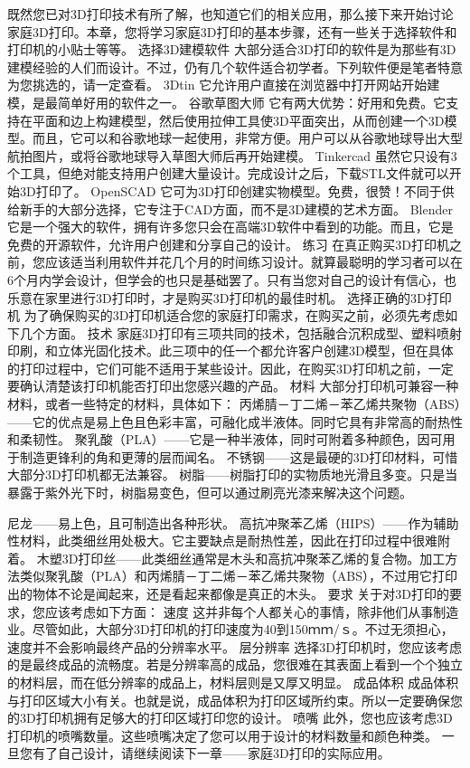 \documentclass[12pt,UTF8]{ctexbook}
\begin{document}
既然您已对3D打印技术有所了解，也知道它们的相关应用，那么接下来开始讨论家庭3D打印。本章，您将学习家庭3D打印的基本步骤，还有一些关于选择软件和打印机的小贴士等等。
选择3D建模软件
大部分适合3D打印的软件是为那些有3D建模经验的人们而设计。不过，仍有几个软件适合初学者。下列软件便是笔者特意为您挑选的，请一定查看。
3Dtin
它允许用户直接在浏览器中打开网站开始建模，是最简单好用的软件之一。
谷歌草图大师
它有两大优势：好用和免费。它支持在平面和边上构建模型，然后使用拉伸工具使3D平面突出，从而创建一个3D模型。而且，它可以和谷歌地球一起使用，非常方便。用户可以从谷歌地球导出大型航拍图片，或将谷歌地球导入草图大师后再开始建模。
Tinkercad
虽然它只设有3个工具，但绝对能支持用户创建大量设计。完成设计之后，下载STL文件就可以开始3D打印了。
OpenSCAD
它可为3D打印创建实物模型。免费，很赞！不同于供给新手的大部分选择，它专注于CAD方面，而不是3D建模的艺术方面。
Blender
它是一个强大的软件，拥有许多您只会在高端3D软件中看到的功能。而且，它是免费的开源软件，允许用户创建和分享自己的设计。
练习
在真正购买3D打印机之前，您应该适当利用软件并花几个月的时间练习设计。就算最聪明的学习者可以在6个月内学会设计，但学会的也只是基础罢了。只有当您对自己的设计有信心，也乐意在家里进行3D打印时，才是购买3D打印机的最佳时机。
选择正确的3D打印机
为了确保购买的3D打印机适合您的家庭打印需求，在购买之前，必须先考虑如下几个方面。
技术
家庭3D打印有三项共同的技术，包括融合沉积成型、塑料喷射印刷，和立体光固化技术。此三项中的任一个都允许客户创建3D模型，但在具体的打印过程中，它们可能不适用于某些设计。因此，在购买3D打印机之前，一定要确认清楚该打印机能否打印出您感兴趣的产品。
材料
大部分打印机可兼容一种材料，或者一些特定的材料，具体如下：
丙烯腈－丁二烯－苯乙烯共聚物（ABS）——它的优点是易上色且色彩丰富，可融化成半液体。同时它具有非常高的耐热性和柔韧性。
聚乳酸（PLA）——它是一种半液体，同时可附着多种颜色，因可用于制造更锋利的角和更薄的层而闻名。
不锈钢——这是最硬的3D打印材料，可惜大部分3D打印机都无法兼容。
树脂——树脂打印的实物质地光滑且多变。只是当暴露于紫外光下时，树脂易变色，但可以通过刷亮光漆来解决这个问题。

尼龙——易上色，且可制造出各种形状。
高抗冲聚苯乙烯（HIPS）——作为辅助性材料，此类细丝用处极大。它主要缺点是耐热性差，因此在打印过程中很难附着。
木塑3D打印丝——此类细丝通常是木头和高抗冲聚苯乙烯的复合物。加工方法类似聚乳酸（PLA）和丙烯腈－丁二烯－苯乙烯共聚物（ABS），不过用它打印出的物体不论是闻起来，还是看起来都像是真正的木头。
要求
关于对3D打印的要求，您应该考虑如下方面：
速度
这并非每个人都关心的事情，除非他们从事制造业。尽管如此，大部分3D打印机的打印速度为40到150ｍｍ/ｓ。不过无须担心，速度并不会影响最终产品的分辨率水平。
层分辨率
选择3D打印机时，您应该考虑的是最终成品的流畅度。若是分辨率高的成品，您很难在其表面上看到一个个独立的材料层，而在低分辨率的成品上，材料层则是又厚又明显。
成品体积
成品体积与打印区域大小有关。也就是说，成品体积为打印区域所约束。所以一定要确保您的3D打印机拥有足够大的打印区域打印您的设计。
喷嘴
此外，您也应该考虑3D打印机的喷嘴数量。这些喷嘴决定了您可以用于设计的材料数量和颜色种类。
一旦您有了自己设计，请继续阅读下一章——家庭3D打印的实际应用。
\end{document}
